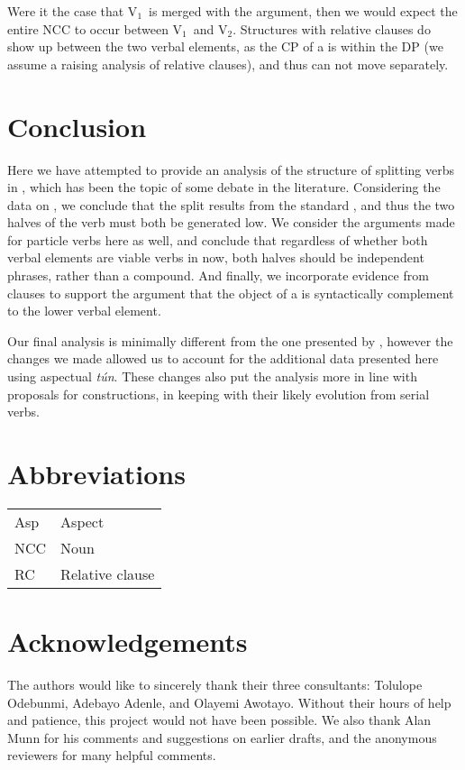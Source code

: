 \documentclass[output=paper]{LSP/langsci}
\begin{document}
Were it the case that V$_{1}$\ is merged with the argument, then we would expect the entire NCC to occur between V$_{1}$\ and V$_{2}$. 
Structures with relative clauses do show up between the two verbal elements, as the CP of a  is within the DP (we assume a raising analysis of relative clauses), and thus can not move separately.

\section{Conclusion}
\label{sect:parrish:conclusion}

Here we have attempted to provide an analysis of the structure of splitting verbs in , which has been the topic of some debate in the literature. Considering the data on , we conclude that the split results from the standard  , and thus the two halves of the verb must both be generated low. We consider the arguments made for particle verbs here as well, and conclude that regardless of whether both verbal elements are viable verbs in  now, both halves should be independent phrases, rather than a compound. And finally, we incorporate evidence from   clauses to support the argument that the object of a  is syntactically complement to the lower verbal element.

Our final analysis is minimally different from the one presented by \citet{Bode2007}, however the changes we made allowed us to account for the additional data presented here using aspectual \textit{t\'{u}n}. These changes also put the analysis more in line with proposals for  constructions, in keeping with their likely evolution from serial verbs.

\section*{Abbreviations} 
	
	\begin{tabular}{ll}   
		Asp & Aspect \\
		NCC & Noun \isi{complement clause} \\
		RC & Relative clause \\ 
	\end{tabular}
	 

\section*{Acknowledgements}
The authors would like to sincerely thank their three consultants: Tolulope Odebunmi, Adebayo Adenle, and Olayemi Awotayo. Without their hours of help and patience, this project would not have been possible. We also thank Alan Munn for his comments and suggestions on earlier drafts, and the anonymous reviewers for many helpful comments.


\printbibliography[heading=subbibliography,notkeyword=this]
\end{document}
